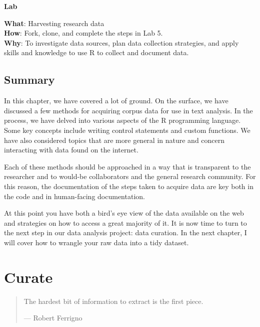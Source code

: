 \documentclass[
  letterpaper,
]{latex/krantz}
\theoremstyle{definition}
\theoremstyle{remark}
\begin{document}
\begin{tcolorbox}[enhanced jigsaw, colback=white, opacityback=0, bottomrule=.15mm, rightrule=.15mm, breakable, left=2mm, arc=.35mm, colframe=quarto-callout-color-frame, leftrule=.75mm, toprule=.15mm]

\textbf{ Lab}

\textbf{What}: Harvesting research data\\
\textbf{How}: Fork, clone, and complete the steps in Lab 5.\\
\textbf{Why}: To investigate data sources, plan data collection
strategies, and apply skills and knowledge to use R to collect and
document data.

\end{tcolorbox}

\section*{Summary}\label{summary-4}


In this chapter, we have covered a lot of ground. On the surface, we
have discussed a few methods for acquiring corpus data for use in text
analysis. In the process, we have delved into various aspects of the R
programming language. Some key concepts include writing control
statements and custom functions. We have also considered topics that are
more general in nature and concern interacting with data found on the
internet.

Each of these methods should be approached in a way that is transparent
to the researcher and to would-be collaborators and the general research
community. For this reason, the documentation of the steps taken to
acquire data are key both in the code and in human-facing documentation.

At this point you have both a bird's eye view of the data available on
the web and strategies on how to access a great majority of it. It is
now time to turn to the next step in our data analysis project: data
curation. In the next chapter, I will cover how to wrangle your raw data
into a tidy dataset.

\chapter{Curate}\label{sec-curate-chapter}

\begin{quote}
The hardest bit of information to extract is the first piece.

--- Robert Ferrigno
\end{quote}
\end{document}
